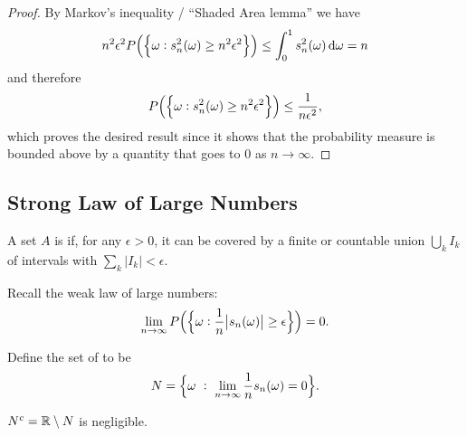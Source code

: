 \begin{proof}
By Markov's inequality / ``Shaded Area lemma​'' we have
\begin{align*}
  n^2\epsilon^2P\Big(\Big\{\om: s_n^2(\om) \geq n^2\epsilon^2\Big\}\Big) \leq \int_0^1 s_n^2(\om) \d\om = n
\end{align*}
and therefore
\begin{align*}
  P\Big(\Big\{\omega: s_n^2(\omega) \geq n^2\epsilon^2\Big\}\Big) \leq  \frac{1}{n\epsilon^2},
\end{align*}
which proves the desired result since it shows that the probability measure is bounded above by a quantity that
goes to $0$ as $n \to \infty$.
\end{proof}

\subsection{Strong Law of Large Numbers}

\begin{definition}
  A set $A$ is  if, for any $\epsilon > 0$, it can be covered by a finite or countable
  union $\bigcup_k I_k$ of intervals with $\sum_k |I_k| < \epsilon$.
\end{definition}

Recall the weak law of large numbers:
  \begin{align*}
    \lim_{n \to \infty}P\Big(\Big\{\om: \frac{1}{n}\big|s_n(\om)\big| \geq \epsilon\Big\}\Big) = 0.
  \end{align*}

\begin{definition}
  Define the set of  to be
  \begin{align*}
    N = \Big\{\om ~:~ \lim_{n\to\infty} \frac{1}{n}s_n(\om) = 0 \Big\}.
  \end{align*}
\end{definition}

\begin{theorem*}
  $N^c = \mathbb{R} \setminus N$ is negligible.
\end{theorem*}

